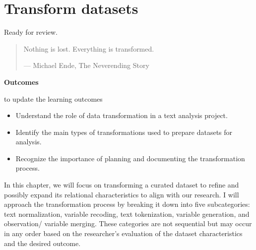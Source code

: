 \documentclass[
  letterpaper,
  DIV=11,
  numbers=noendperiod]{scrreport}
\providecommand{\tightlist}{%
  \setlength{\itemsep}{0pt}\setlength{\parskip}{0pt}}\usepackage{longtable,booktabs,array}
\theoremstyle{definition}
\theoremstyle{remark}
\begin{document}
\hypertarget{sec-transform-datasets}{%
\chapter{Transform datasets}\label{sec-transform-datasets}}

\begin{tcolorbox}[enhanced jigsaw, coltitle=black, breakable, colbacktitle=quarto-callout-tip-color!10!white, title=\textcolor{quarto-callout-tip-color}{\faLightbulb}\hspace{0.5em}{Draft}, leftrule=.75mm, bottomrule=.15mm, arc=.35mm, left=2mm, colback=white, toptitle=1mm, colframe=quarto-callout-tip-color-frame, bottomtitle=1mm, toprule=.15mm, rightrule=.15mm, titlerule=0mm, opacitybacktitle=0.6, opacityback=0]

Ready for review.

\end{tcolorbox}

\begin{quote}
Nothing is lost. Everything is transformed.

--- Michael Ende, The Neverending Story
\end{quote}

\begin{tcolorbox}[enhanced jigsaw, leftrule=.75mm, bottomrule=.15mm, opacityback=0, breakable, left=2mm, colback=white, toprule=.15mm, arc=.35mm, rightrule=.15mm]

\textbf{ Outcomes}

 to update the learning outcomes

\begin{itemize}
\tightlist
\item
  Understand the role of data transformation in a text analysis project.
\item
  Identify the main types of transformations used to prepare datasets
  for analysis.
\item
  Recognize the importance of planning and documenting the
  transformation process.
\end{itemize}

\end{tcolorbox}

In this chapter, we will focus on transforming a curated dataset to
refine and possibly expand its relational characteristics to align with
our research. I will approach the transformation process by breaking it
down into five subcategories: text normalization, variable recoding,
text tokenization, variable generation, and observation/ variable
merging. These categories are not sequential but may occur in any order
based on the researcher's evaluation of the dataset characteristics and
the desired outcome.
\end{document}
